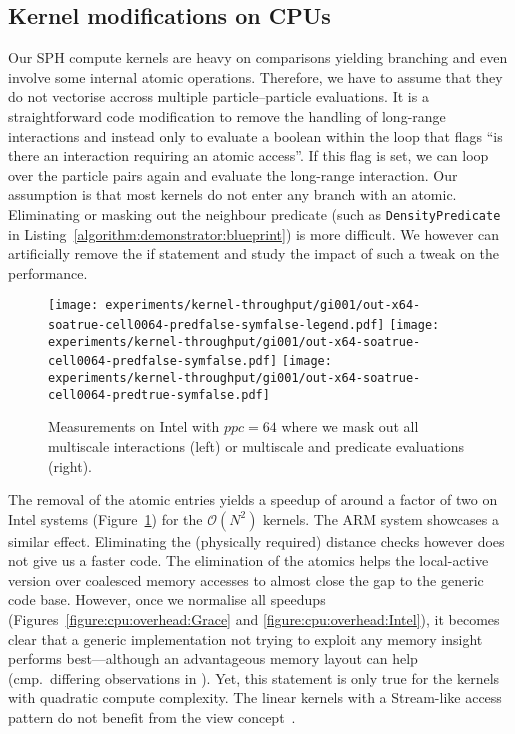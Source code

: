 \subsection{Kernel modifications on CPUs}

Our SPH compute kernels are heavy on comparisons yielding branching and even involve some internal atomic operations.
Therefore, we have to assume that they do not vectorise accross multiple particle--particle evaluations.
It is a straightforward code modification to remove the handling of long-range interactions and instead only to evaluate a boolean within the loop that flags ``is there an interaction requiring an atomic access''.
If this flag is set, we can loop over the particle pairs again and evaluate the long-range interaction.
Our assumption is that most kernels do not enter any branch with an atomic.
Eliminating or masking out the neighbour predicate (such as \texttt{DensityPredicate} in Listing~\ref{algorithm:demonstrator:blueprint}) is more difficult.
We however can artificially remove the if statement and study the impact of such a tweak on the performance.


\begin{figure}[H]
  \begin{center}
    \texttt{[image: experiments/kernel-throughput/gi001/out-x64-soatrue-cell0064-predfalse-symfalse-legend.pdf]}
    \texttt{[image: experiments/kernel-throughput/gi001/out-x64-soatrue-cell0064-predfalse-symfalse.pdf]}
    \texttt{[image: experiments/kernel-throughput/gi001/out-x64-soatrue-cell0064-predtrue-symfalse.pdf]}
  \end{center}
  \caption{
    Measurements on Intel with $ppc=64$ where we mask out all multiscale interactions (left) or multiscale and predicate evaluations (right).
   \label{figure:results:cpu-ppc64}
  }
\end{figure}


%
%
The removal of the atomic entries yields a speedup of around a factor of two on Intel systems (Figure~\ref{figure:results:cpu-ppc64}) for the $\mathcal{O}(N^2)$ kernels.
The ARM system showcases a similar effect.
Eliminating the (physically required) distance checks however does not give us a faster code.
The elimination of the atomics helps the local-active version over coalesced memory accesses to almost close the gap to the generic code base.
However, once we normalise all speedups (Figures~\ref{figure:cpu:overhead:Grace} and \ref{figure:cpu:overhead:Intel}), it becomes clear that a generic implementation not trying to exploit any memory insight performs best---although an advantageous memory layout can help (cmp.~differing observations in \cite{Hundt:2006:StructureLayoutOptimisation,Intel:MemoryLayoutTransformations}).
Yet, this statement is only true for the kernels with quadratic compute complexity. 
The linear kernels with a Stream-like access pattern do not benefit from the view concept~\cite{Homann:2018:SoAx,Strzodka:2011:AbstractionSoA}.




